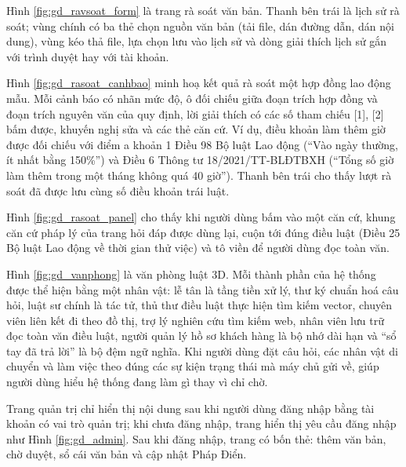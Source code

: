 \documentclass[../DoAn.tex]{subfiles}
\begin{document}
Hình \ref{fig:gd_ravsoat_form} là trang rà soát văn bản. Thanh bên trái là lịch sử rà soát; vùng chính có ba thẻ chọn nguồn văn bản (tải file, dán đường dẫn, dán nội dung), vùng kéo thả file, lựa chọn lưu vào lịch sử và dòng giải thích lịch sử gắn với trình duyệt hay với tài khoản.


Hình \ref{fig:gd_rasoat_canhbao} minh hoạ kết quả rà soát một hợp đồng lao động mẫu. Mỗi cảnh báo có nhãn mức độ, ô đối chiếu giữa đoạn trích hợp đồng và đoạn trích nguyên văn của quy định, lời giải thích có các số tham chiếu [1], [2] bấm được, khuyến nghị sửa và các thẻ căn cứ. Ví dụ, điều khoản làm thêm giờ được đối chiếu với điểm a khoản 1 Điều 98 Bộ luật Lao động (``Vào ngày thường, ít nhất bằng 150\%'') và Điều 6 Thông tư 18/2021/TT-BLĐTBXH (``Tổng số giờ làm thêm trong một tháng không quá 40 giờ''). Thanh bên trái cho thấy lượt rà soát đã được lưu cùng số điều khoản trái luật.


Hình \ref{fig:gd_rasoat_panel} cho thấy khi người dùng bấm vào một căn cứ, khung căn cứ pháp lý của trang hỏi đáp được dùng lại, cuộn tới đúng điều luật (Điều 25 Bộ luật Lao động về thời gian thử việc) và tô viền để người dùng đọc toàn văn.


Hình \ref{fig:gd_vanphong} là văn phòng luật 3D. Mỗi thành phần của hệ thống được thể hiện bằng một nhân vật: lễ tân là tầng tiền xử lý, thư ký chuẩn hoá câu hỏi, luật sư chính là tác tử, thủ thư điều luật thực hiện tìm kiếm vector, chuyên viên liên kết đi theo đồ thị, trợ lý nghiên cứu tìm kiếm web, nhân viên lưu trữ đọc toàn văn điều luật, người quản lý hồ sơ khách hàng là bộ nhớ dài hạn và ``sổ tay đã trả lời'' là bộ đệm ngữ nghĩa. Khi người dùng đặt câu hỏi, các nhân vật di chuyển và làm việc theo đúng các sự kiện trạng thái mà máy chủ gửi về, giúp người dùng hiểu hệ thống đang làm gì thay vì chỉ chờ.


Trang quản trị chỉ hiển thị nội dung sau khi người dùng đăng nhập bằng tài khoản có vai trò quản trị; khi chưa đăng nhập, trang hiển thị yêu cầu đăng nhập như Hình \ref{fig:gd_admin}. Sau khi đăng nhập, trang có bốn thẻ: thêm văn bản, chờ duyệt, sổ cái văn bản và cập nhật Pháp Điển.
\end{document}
